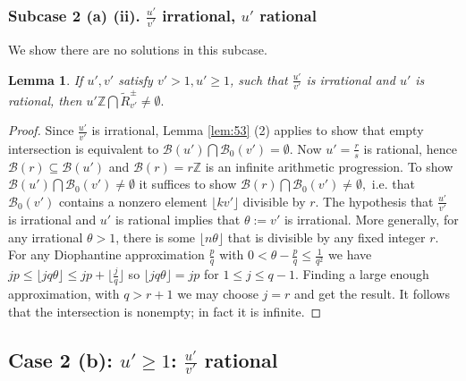 \documentclass[12pt,letterpaper, reqno]{amsart}
\newtheorem{lem}[thm]{Lemma}
\theoremstyle{definition}
\theoremstyle{remark}
\newcommand{\ZZ}{\ensuremath{\mathbb{Z}}}
\newcommand{\uu}{{u'}}
\newcommand{\vv}{{v'}}
\newcommand{\sB}{{\mathcal B}}
\newcommand{\floor}[1]{\lfloor{#1}\rfloor}
\begin{document}
\subsubsection{Subcase 2 (a) (ii). $\frac{\uu}{\vv}$ irrational, $\uu$ rational}\label{sec:542}

We show there  are no solutions in this subcase.

\begin{lem}\label{lem:57}
If  $\uu, \vv$ satisfy ${\vv}>1, \uu \ge 1$, such that
 $\frac{\uu}{\vv}$ is irrational and $\uu$ is rational, then
  $\uu\ZZ \bigcap  \widetilde{R}_\vv^{\pm} \ne \emptyset.$
\end{lem}

\begin{proof}
Since $\frac{\uu}{\vv}$ is irrational, 
 Lemma \ref{lem:53} (2) applies to show  that empty
 intersection is equivalent 
to $\sB(\uu) \bigcap \sB_0({\vv}) =\emptyset.$
Now ${\uu} = \frac{r}{s}$ is rational, hence $ \sB(r) \subseteq \sB(\uu)$
and $\sB(r) = r\ZZ$  is an infinite arithmetic progression. 
To show $\sB(\uu) \bigcap \sB_0({\vv}) \ne \emptyset$
it suffices to show $\sB(r ) \bigcap \sB_0( {\vv}) \ne \emptyset,$ i.e. 
 that $\sB_0( {\vv})$  
contains a nonzero  element $ \floor{ {k}{\vv} } $ divisible by $r$.
The hypothesis that $\frac{\uu}{\vv}$ is irrational and $\uu$ is
rational  implies that $\theta := {\vv} $ is irrational.
More generally, for any irrational $\theta >1$, there is some $\floor{ n \theta }$
that is divisible by any fixed integer $r$. For any  Diophantine approximation $\frac{p}{q}$ with 
$0 < \theta - \frac{p}{q}   \le \frac{1}{q^2}$ we have $jp \leq \floor{ j q \theta } \leq  jp + \floor{\frac{j}{q}}$ so $\floor{ j q \theta } =  jp$ for $1\le j \le q-1$.
Finding a large enough approximation, with $q > r+1$ we may choose $j=r$
and get the result. It follows that the intersection is nonempty; in fact it is infinite.
\end{proof}




%
%
\subsection{Case 2 (b):  $\uu \ge 1$: $\frac{\uu}{\vv}$ rational }\label{sec:55}
\end{document}
